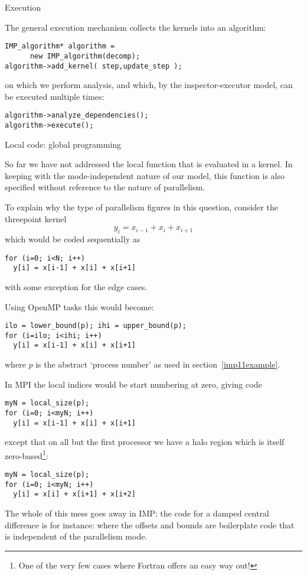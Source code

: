  {Execution}

The general execution mechanism collects the kernels into an algorithm:
\begin{verbatim}
IMP_algorithm* algorithm = 
      new IMP_algorithm(decomp);
algorithm->add_kernel( step,update_step );
\end{verbatim}
on which we perform analysis, and which,
by the inspector-executor model, can be executed multiple times:
\begin{verbatim}
algorithm->analyze_dependencies();
algorithm->execute();
\end{verbatim}

 {Local code: global programming}

So far we have not addressed the local function that is evaluated in a
kernel. In keeping with the mode-independent nature of our model, this
function is also specified without reference to the nature of
parallelism.

To explain why the type of parallelism figures in this question, consider
the threepoint kernel
\[ y_i = x_{i-1}+x_i+x_{i+1} \]
which would be coded sequentially as
\begin{verbatim}
for (i=0; i<N; i++)
  y[i] = x[i-1] + x[i] + x[i+1]
\end{verbatim}
with some exception for the edge cases.

Using OpenMP tasks this would become:
\begin{verbatim}
ilo = lower_bound(p); ihi = upper_bound(p);
for (i=ilo; i<ihi; i++)
  y[i] = x[i-1] + x[i] + x[i+1]
\end{verbatim}
where $p$ is the abstract `process number' as used in
section~\ref{imp11example}.

In MPI the local indices would be start numbering at zero, giving code
\begin{verbatim}
myN = local_size(p);
for (i=0; i<myN; i++)
  y[i] = x[i-1] + x[i] + x[i+1]
\end{verbatim}
except that on all but the first processor we have a halo region which
is itself zero-based\footnote{One of the very few cases where Fortran
  offers an easy way out!}:
\begin{verbatim}
myN = local_size(p);
for (i=0; i<myN; i++)
  y[i] = x[i] + x[i+1] + x[i+2]
\end{verbatim}

The whole of this mess goes away in \ac{IMP}: the code for a damped
central difference is for instance:
%
%
where the offsets and bounds are boilerplate code that is independent
of the parallelism mode.

